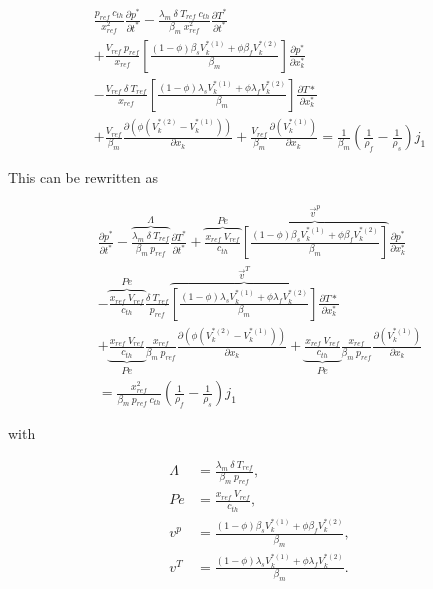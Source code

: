 \documentclass[]{scrreprt}
\begin{document}
\begin{multline}
  \label{eq:mixture_mass_balance4}
  \frac{p_{ref} \: c_{th}}{x^2_{ref}} \frac{\partial p^*}{\partial t^*} 
  - \frac{\lambda_m \: \delta \: T_{ref} \: c_{th}}{\beta_m\:x^2_{ref}} \frac{\partial T^*}{\partial t^*} \\
  + \frac{V_{ref} \: p_{ref}}{x_{ref}}\left[\frac{(1-\phi)\beta_s V^{*(1)}_k + \phi\beta_f V^{*(2)}_k}{\beta_m} \right] \frac{\partial p^*}{\partial x^*_k} \\
  - \frac{V_{ref}\:\delta\:T_{ref}}{x_{ref}}\left[\frac{(1-\phi)\lambda_s V^{*(1)}_k + \phi\lambda_f V^{*(2)}_k}{\beta_m} \right] \frac{\partial T*}{\partial x^*_k} \\
  + \frac{V_{ref}}{\beta_m} \frac{\partial( \phi (V^{*(2)}_k -V^{*(1)}_k))}{\partial x_k}
  + \frac{V_{ref}}{\beta_m} \frac{\partial(V^{*(1)}_k)}{\partial x_k}  
  = \frac{1}{\beta_m} \left(\frac{1}{\rho_f} - \frac{1}{\rho_s}\right)j_1
\end{multline}

This can be rewritten as

\begin{multline}
  \label{eq:mixture_mass_balance5}
  \frac{\partial p^*}{\partial t^*} 
  - \overbrace{\frac{\lambda_m \: \delta \: T_{ref}}{\beta_m\:p_{ref}}}^{\Lambda} \frac{\partial T^*}{\partial t^*} 
  + \overbrace{\frac{x_{ref}\:V_{ref}}{c_{th}}}^{Pe}  \overbrace{\left[\frac{(1-\phi)\beta_s V^{*(1)}_k + \phi\beta_f V^{*(2)}_k}{\beta_m} \right]}^{\vec{v}^p} \frac{\partial p^*}{\partial x^*_k} \\
  - \overbrace{\frac{x_{ref}\:V_{ref}}{c_{th}}}^{Pe}  \frac{\delta\:T_{ref}}{p_{ref}}\overbrace{\left[\frac{(1-\phi)\lambda_s V^{*(1)}_k + \phi\lambda_f V^{*(2)}_k}{\beta_m} \right]}^{\vec{v}^T} \frac{\partial T*}{\partial x^*_k} \\
  + \underbrace{\frac{x_{ref}\:V_{ref}}{c_{th}}}_{Pe} \frac{x_{ref}}{\beta_m\:p_{ref}} \frac{\partial( \phi (V^{*(2)}_k -V^{*(1)}_k))}{\partial x_k}
  + \underbrace{\frac{x_{ref}\:V_{ref}}{c_{th}}}_{Pe} \frac{x_{ref}}{\beta_m\:p_{ref}} \frac{\partial(V^{*(1)}_k)}{\partial x_k}  \\
  = \frac{x^2_{ref}}{\beta_m\:p_{ref}\:c_{th}} \left(\frac{1}{\rho_f} - \frac{1}{\rho_s}\right)j_1
\end{multline}

with

\begin{subequations}
  \label{eq:def_parameters}
  \begin{align}
  \Lambda &= \frac{\lambda_m \: \delta \: T_{ref}}{\beta_m\:p_{ref}}, \\   
  Pe &= \frac{x_{ref}\:V_{ref}}{c_{th}}, \\   
  v^p &= \frac{(1-\phi)\beta_s V^{*(1)}_k + \phi\beta_f V^{*(2)}_k}{\beta_m}, \\   
  v^T &= \frac{(1-\phi)\lambda_s V^{*(1)}_k + \phi\lambda_f V^{*(2)}_k}{\beta_m}.
  \end{align}
\end{subequations}

%
\end{document}

